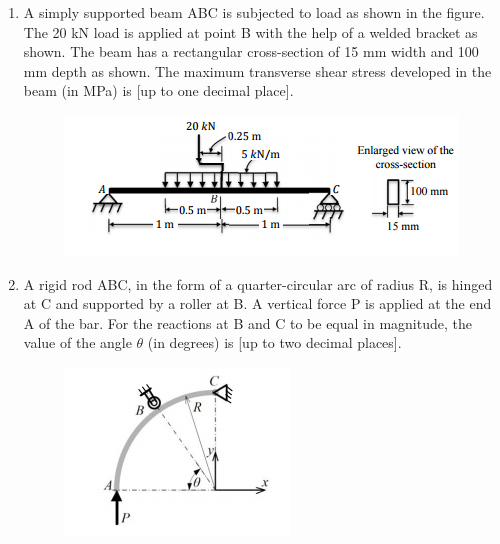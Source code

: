 \documentclass[a4paper,10pt]{article}
\begin{document}
\begin{enumerate}
    \item A simply supported beam ABC is subjected to load as shown in the figure. The 20 kN load is applied at point B with the help of a welded bracket as shown. The beam has a rectangular cross-section of 15 mm width and 100 mm depth as shown. The maximum transverse shear stress developed in the beam (in MPa) is \underline{\hspace{2cm}} [up to one decimal place].
    \begin{figure}[H] \centering \includegraphics[width=0.8\columnwidth]{q19_solid.png} \caption*{} \label{fig:q19_solid} \end{figure}
    \hfill{}

    \item A rigid rod ABC, in the form of a quarter-circular arc of radius R, is hinged at C and supported by a roller at B. A vertical force P is applied at the end A of the bar. For the reactions at B and C to be equal in magnitude, the value of the angle $\theta$ (in degrees) is \underline{\hspace{2cm}} [up to two decimal places].
    \begin{figure}[H] \centering \includegraphics[width=0.4\columnwidth]{q20_solid.png} \caption*{} \label{fig:q20_solid} \end{figure}
    \hfill{}


\end{enumerate}
\end{document}
